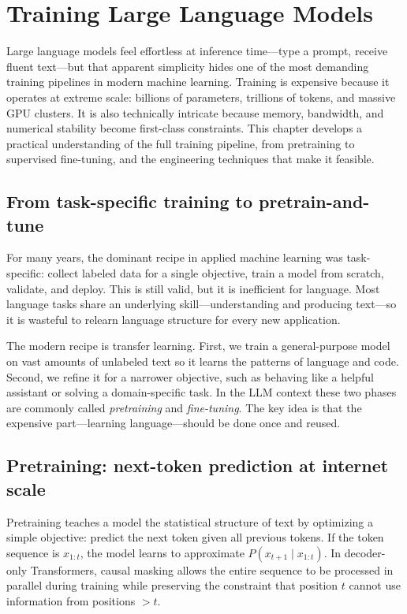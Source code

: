
\chapter{Training Large Language Models}
\label{chap:training-llms}

Large language models feel effortless at inference time—type a prompt, receive fluent text—but that apparent simplicity hides one of the most demanding training pipelines in modern machine learning. Training is expensive because it operates at extreme scale: billions of parameters, trillions of tokens, and massive GPU clusters. It is also technically intricate because memory, bandwidth, and numerical stability become first-class constraints. This chapter develops a practical understanding of the full training pipeline, from pretraining to supervised fine-tuning, and the engineering techniques that make it feasible.

\section{From task-specific training to pretrain-and-tune}
For many years, the dominant recipe in applied machine learning was task-specific: collect labeled data for a single objective, train a model from scratch, validate, and deploy. This is still valid, but it is inefficient for language. Most language tasks share an underlying skill—understanding and producing text—so it is wasteful to relearn language structure for every new application.

The modern recipe is transfer learning. First, we train a general-purpose model on vast amounts of unlabeled text so it learns the patterns of language and code. Second, we refine it for a narrower objective, such as behaving like a helpful assistant or solving a domain-specific task. In the LLM context these two phases are commonly called \emph{pretraining} and \emph{fine-tuning}. The key idea is that the expensive part—learning language—should be done once and reused.

\section{Pretraining: next-token prediction at internet scale}
Pretraining teaches a model the statistical structure of text by optimizing a simple objective: predict the next token given all previous tokens. If the token sequence is \(x_{1:t}\), the model learns to approximate \(P(x_{t+1}\mid x_{1:t})\). In decoder-only Transformers, causal masking allows the entire sequence to be processed in parallel during training while preserving the constraint that position \(t\) cannot use information from positions \(>t\).

